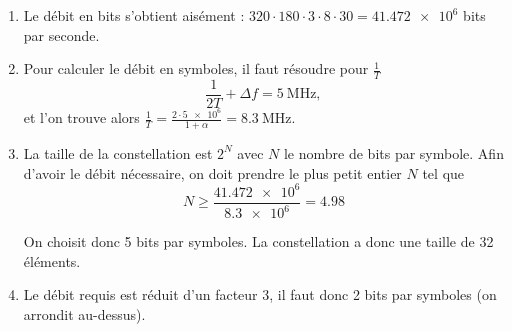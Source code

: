 \documentclass [a4paper, 11pt] {article}
\begin{document}
    \begin{reponse}
        \begin{enumerate}
            \item Le débit en bits s'obtient aisément : $320\cdot180\cdot3\cdot8\cdot30= \num{41.472e6}$ bits par seconde.
            \item Pour calculer le débit en symboles, il faut résoudre pour $\frac{1}{T}$
            \begin{equation}
                \frac{1}{2T} + \Delta f = \SI{5}{\mega\hertz},
            \end{equation}
            et l'on trouve alors $\frac{1}{T} = \frac{2 \cdot \num{5e6}}{1 + \alpha}= \SI{8.3}{\mega\hertz}$.
            \item La taille de la constellation est $2^N$ avec $N$ le nombre de bits par symbole. Afin d'avoir le débit nécessaire, on doit prendre le plus petit entier $N$ tel que
            \begin{equation}
                N \ge \frac{\num{41.472e6}}{\num{8.3e6}} = 4.98
            \end{equation}
            
            On choisit donc 5 bits par symboles. La constellation a donc une taille de 32 éléments.
            \item Le débit requis est réduit d'un facteur 3, il faut donc 2 bits par symboles (on arrondit au-dessus).
        \end{enumerate}
    \end{reponse}
\end{document}
